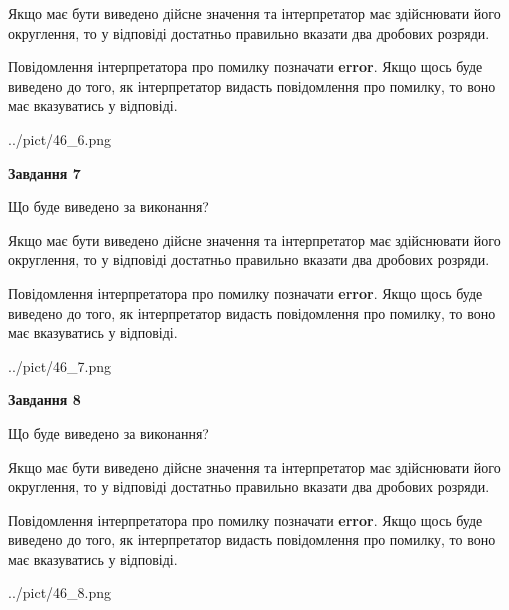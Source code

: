 \documentclass[12pt, ukrainian]{article}
\begin{document}
{\begin {Large}
Якщо має бути виведено дійсне значення та інтерпретатор має здійснювати його округлення, 
то у відповіді достатньо правильно вказати два дробових розряди.

Повідомлення інтерпретатора про помилку позначати \textbf{error}.
Якщо щось буде виведено до того, як інтерпретатор видасть повідомлення про помилку, 
то воно має вказуватись у відповіді. \par

\begin{center}
	{../pict/46_6.png}
\end{center}
\newpage

{\begin {center}\textbf{Завдання 7}\end {center}}\par
Що буде виведено за виконання? \par

Якщо має бути виведено дійсне значення та інтерпретатор має здійснювати його округлення, 
то у відповіді достатньо правильно вказати два дробових розряди.

Повідомлення інтерпретатора про помилку позначати \textbf{error}.
Якщо щось буде виведено до того, як інтерпретатор видасть повідомлення про помилку, 
то воно має вказуватись у відповіді. \par

\begin{center}
	{../pict/46_7.png}
\end{center}
\newpage

{\begin {center}\textbf{Завдання 8}\end {center}}\par
Що буде виведено за виконання? \par

Якщо має бути виведено дійсне значення та інтерпретатор має здійснювати його округлення, 
то у відповіді достатньо правильно вказати два дробових розряди.

Повідомлення інтерпретатора про помилку позначати \textbf{error}.
Якщо щось буде виведено до того, як інтерпретатор видасть повідомлення про помилку, 
то воно має вказуватись у відповіді. \par

\begin{center}
	{../pict/46_8.png}
\end{center}
\newpage


\end{Large}}
\end{document}
